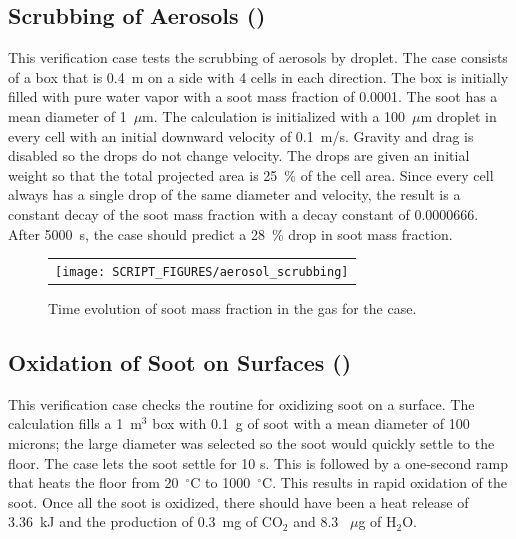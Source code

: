 \documentclass[11pt]{book}
\begin{document}
\subsection{Scrubbing of Aerosols (\texorpdfstring{}{aerosol\_scrubbing})}
\label{aerosol_scrubbing}

This verification case tests the scrubbing of aerosols by droplet. The case consists of a box that is 0.4~m on a side with 4 cells in each direction. The box is initially filled with pure water vapor with a soot mass fraction of 0.0001. The soot has a mean diameter of 1~$\mu$m. The calculation is initialized with a 100~$\mu$m droplet in every cell with an initial downward velocity of 0.1~m/s. Gravity and drag is disabled so the drops do not change velocity. The drops are given an initial weight so that the total projected area is 25~\% of the cell area. Since every cell always has a single drop of the same diameter and velocity, the result is a constant decay of the soot mass fraction with a decay constant of 0.0000666. After 5000~s, the case should predict a 28~\% drop in soot mass fraction.

\begin{figure}[ht]
	\centering
	\begin{tabular}{c}
		\texttt{[image: SCRIPT\_FIGURES/aerosol\_scrubbing]}
	\end{tabular}
	\caption[Gas phase soot mass fractions the  cases]{Time evolution of soot mass fraction in the gas for the  case.}
	\label{fig:scrubbing}
\end{figure}


\subsection{Oxidation of Soot on Surfaces (\texorpdfstring{}{soot\_oxidation\_wall})}
\label{soot_oxidation_wall}

This verification case checks the routine for oxidizing soot on a surface. The calculation fills a 1~m$^3$ box with 0.1~g of soot with a mean diameter of 100 microns; the large diameter was selected so the soot would quickly settle to the floor. The case lets the soot settle for 10 s. This is followed by a one-second ramp that heats the floor from 20~$^\circ$C to 1000~$^\circ$C. This results in rapid oxidation of the soot. Once all the soot is oxidized, there should have been a heat release of  3.36~kJ and the production of 0.3~mg of CO$_2$ and 8.3 ~$\mu$g of H$_2$O.
\end{document}
